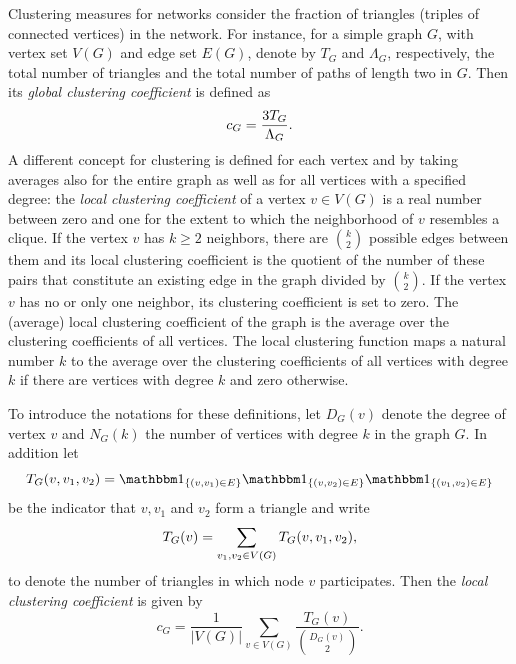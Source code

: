 Clustering measures for networks consider the fraction of triangles (triples of connected vertices) in the network. 
For instance, for a simple graph $G$, with vertex set $V(G)$ and edge set $E(G)$, denote by $T_G$ and $\Lambda_G$, respectively, the total number of triangles and the total number of paths of length two in $G$. Then its \emph{global clustering coefficient} is defined as
\[
	c_G = \frac{3 T_G}{\Lambda_G}.
\]
A different concept for clustering is defined for each vertex and by taking averages also for the entire graph as well as for all vertices with a specified degree: the \emph{local clustering coefficient} of a vertex $v \in V(G)$ is a real number between zero and one for the extent to which the neighborhood of $v$ resembles a clique. If the vertex $v$ has $k\geq 2$ neighbors, there are ${k \choose 2}$ possible edges between them and its local clustering coefficient is the quotient of the number of these pairs that constitute an existing edge in the graph divided by ${k \choose 2}$.  
If the vertex $v$ has no or only one neighbor, its clustering coefficient is set to zero. The (average) local clustering coefficient of the graph is the average over the clustering coefficients of all vertices. The local clustering function maps a natural number $k$ to the average over the clustering coefficients of all vertices with degree $k$ if there are vertices with degree $k$ and zero otherwise.

To introduce the notations for these definitions, let $D_G(v)$ denote the degree of vertex $v$ and $N_G(k)$ the number of vertices with degree $k$ in the graph $G$. In addition let $$\T_G(v,v_1,v_2) = \ind{(v,v_1) \in E} \ind{(v, v_2) \in E} \ind{(v_1, v_2) \in E}$$ be the indicator that $v, v_1$ and $v_2$ form a triangle and write
\begin{equation}
	T_G(v) = \sum_{v_1, v_2 \in V(G)} T_G(v,v_1,v_2),
\end{equation}
to denote the number of triangles in which node $v$ participates. Then the \emph{local clustering coefficient} is given by
\[
	c_G = \frac{1}{|V(G)|} \sum_{v \in V(G)} \frac{T_G(v)}{\binom{D_G(v)}{2}}.
\]


